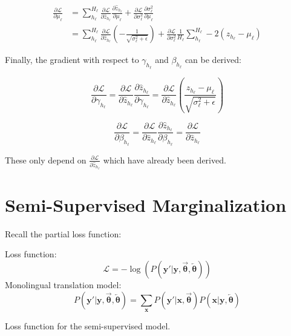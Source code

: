 \begin{equation}
\begin{aligned}
\frac{\partial \mathcal{L}}{\partial \mu_\ell} &= \sum_{h_\ell}^{H_\ell} \frac{\partial \mathcal{L}}{\partial \hat{z}_{h_\ell}} \frac{\partial \hat{z}_{h_\ell}}{\partial \mu_\ell} + \frac{\partial \mathcal{L}}{\partial \sigma_{\ell}^2} \frac{\partial \sigma_\ell^2}{\partial \mu_\ell} \\
&= \sum_{h_\ell}^{H_\ell} \frac{\partial \mathcal{L}}{\partial \hat{z}_{h_\ell}} \left(- \frac{1}{\sqrt{\sigma_\ell^2 + \epsilon}}\right) + \frac{\partial \mathcal{L}}{\partial \sigma_{\ell}^2} \frac{1}{H_\ell} \sum_{h_\ell}^{H_\ell} -2 \left(z_{h_\ell} - \mu_\ell\right)
\end{aligned}
\end{equation}

Finally, the gradient with respect to $\gamma_{h_\ell}$ and $\beta_{h_\ell}$ can be derived:

\begin{equation}
\frac{\partial \mathcal{L}}{\partial \gamma_{h_\ell}} = \frac{\partial \mathcal{L}}{\partial \hat{z}_{h_\ell}} \frac{\partial \hat{z}_{h_\ell}}{\partial \gamma_{h_\ell}} = \frac{\partial \mathcal{L}}{\partial \hat{z}_{h_\ell}} \left(\frac{z_{h_\ell} - \mu_\ell}{\sqrt{\sigma_\ell^2 + \epsilon}}\right)
\end{equation}

\begin{equation}
\frac{\partial \mathcal{L}}{\partial \beta_{h_\ell}} = \frac{\partial \mathcal{L}}{\partial \hat{z}_{h_\ell}} \frac{\partial \hat{z}_{h_\ell}}{\partial \beta_{h_\ell}} = \frac{\partial \mathcal{L}}{\partial \hat{z}_{h_\ell}}
\end{equation}

These only depend on $\frac{\partial \mathcal{L}}{\partial \hat{z}_{h_\ell}}$ which have already been derived.

\clearpage
\section{Semi-Supervised Marginalization}
\label{appendix:backward-pass:semi-sum}

Recall the partial loss function:

\begin{equationbox}[H]
Loss function:
\begin{equation*}
\mathcal{L} = -\log(P(\mathbf{y}'|\mathbf{y}, \overrightarrow{\boldsymbol\theta}, \overleftarrow{\boldsymbol\theta}))
\end{equation*}
Monolingual translation model:
\begin{equation*}
P(\mathbf{y}'|\mathbf{y}, \overrightarrow{\boldsymbol\theta}, \overleftarrow{\boldsymbol\theta}) = \sum_{\mathbf{x}} P(\mathbf{y}'|\mathbf{x}, \overrightarrow{\boldsymbol\theta}) P(\mathbf{x}|\mathbf{y}, \overleftarrow{\boldsymbol\theta})
\end{equation*}
\caption{Loss function for the semi-supervised model.}
\end{equationbox}

